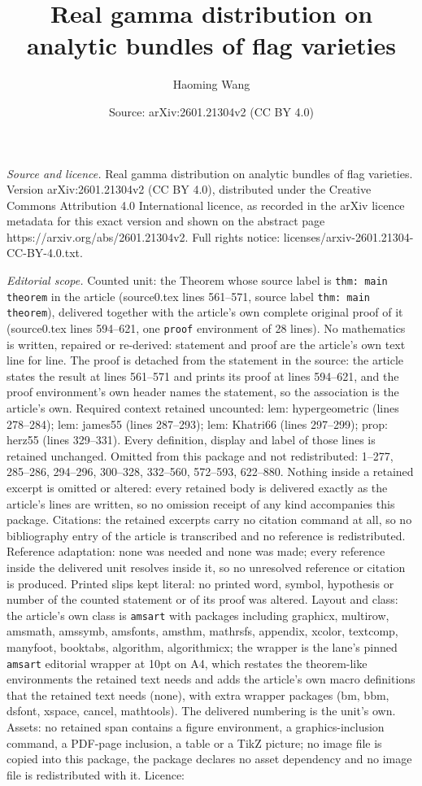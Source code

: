 \documentclass[10pt,a4paper]{amsart}
\title[Real gamma distribution on analytic bundles of flag varietie]{Real gamma distribution on analytic bundles of flag varieties}
\author{Haoming Wang}
\date{Source: arXiv:2601.21304v2 (CC BY 4.0)}
\begin{document}
\maketitle

\noindent\emph{Source and licence.} Real gamma distribution on analytic bundles of flag varieties. Version arXiv:2601.21304v2 (CC BY 4.0), distributed under the Creative Commons Attribution 4.0 International licence, as recorded in the arXiv licence metadata for this exact version and shown on the abstract page https://arxiv.org/abs/2601.21304v2. Full rights notice: licenses/arxiv-2601.21304-CC-BY-4.0.txt.\par\smallskip

\noindent\textit{Editorial scope.} Counted unit: the Theorem whose source label is \texttt{thm: main theorem} in the article (source0.tex lines 561--571, source label \texttt{thm: main theorem}), delivered together with the article's own complete original proof of it (source0.tex lines 594--621, one \texttt{proof} environment of 28 lines). No mathematics is written, repaired or re-derived: statement and proof are the article's own text line for line. The proof is detached from the statement in the source: the article states the result at lines 561--571 and prints its proof at lines 594--621, and the proof environment's own header names the statement, so the association is the article's own. Required context retained uncounted: lem: hypergeometric (lines 278--284); lem: james55 (lines 287--293); lem: Khatri66 (lines 297--299); prop: herz55 (lines 329--331). Every definition, display and label of those lines is retained unchanged. Omitted from this package and not redistributed: 1--277, 285--286, 294--296, 300--328, 332--560, 572--593, 622--880. Nothing inside a retained excerpt is omitted or altered: every retained body is delivered exactly as the article's lines are written, so no omission receipt of any kind accompanies this package. Citations: the retained excerpts carry no citation command at all, so no bibliography entry of the article is transcribed and no reference is redistributed. Reference adaptation: none was needed and none was made; every reference inside the delivered unit resolves inside it, so no unresolved reference or citation is produced. Printed slips kept literal: no printed word, symbol, hypothesis or number of the counted statement or of its proof was altered. Layout and class: the article's own class is \texttt{amsart} with packages including graphicx, multirow, amsmath, amssymb, amsfonts, amsthm, mathrsfs, appendix, xcolor, textcomp, manyfoot, booktabs, algorithm, algorithmicx; the wrapper is the lane's pinned \texttt{amsart} editorial wrapper at 10pt on A4, which restates the theorem-like environments the retained text needs and adds the article's own macro definitions that the retained text needs (none), with extra wrapper packages (bm, bbm, dsfont, xspace, cancel, mathtools). The delivered numbering is the unit's own. Assets: no retained span contains a figure environment, a graphics-inclusion command, a PDF-page inclusion, a table or a TikZ picture; no image file is copied into this package, the package declares no asset dependency and no image file is redistributed with it. Licence: 
\end{document}
